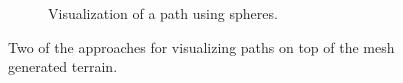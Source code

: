 \begin{figure}[H]
\begin{subfigure}[b]{0.3\textwidth}
    \caption{Visualization of a path using spheres.}
  \end{subfigure}
  \caption{Two of the approaches for visualizing paths on top of the mesh generated terrain.}
  \label{fig:visuals}
\end{figure}
